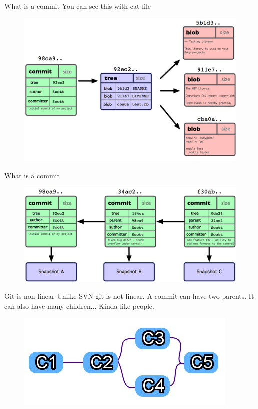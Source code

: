 \documentclass[14pt]{beamer}
\begin{document}
\begin{frame}{What is a commit}
	You can see this with cat-file
	\begin{figure}[htb]
		\centering
		\includegraphics[width=\textwidth]{commitBlobs.png}
	\end{figure}
\end{frame}

\begin{frame}{What is a commit}
	\begin{figure}[htb]
		\centering
		\includegraphics[width=\textwidth]{commitSnapshots.png}
	\end{figure}
\end{frame}

\begin{frame}{Git is non linear}
	Unlike SVN git is not linear.  A commit can have two parents.  It can also have many children... Kinda like people.
	\begin{figure}[htb]
		\centering
		\includegraphics[width=\textwidth]{nonLinearCommits.jpg}
	\end{figure}
\end{frame}
\end{document}
